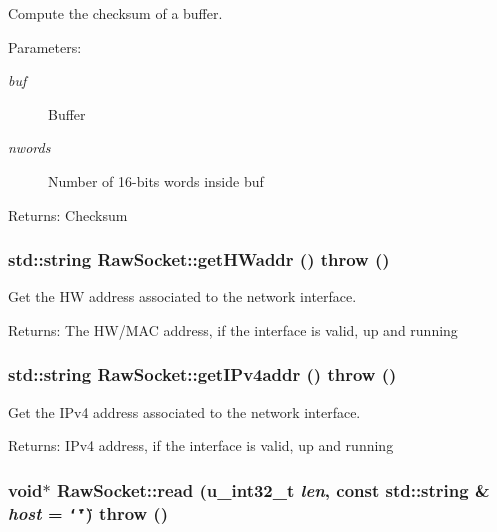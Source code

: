 Compute the checksum of a buffer. 

\begin{Desc}
\item[Parameters:]
\begin{description}
\item[{\em buf}]Buffer \item[{\em nwords}]Number of 16-bits words inside buf \end{description}
\end{Desc}
\begin{Desc}
\item[Returns:]Checksum \end{Desc}
\hypertarget{classRawSocket_b35260c4a551194b50925537785bcf47}{
\subsubsection[{getHWaddr}]{\setlength{\rightskip}{0pt plus 5cm}std::string RawSocket::getHWaddr ()  throw ()}}
\label{classRawSocket_b35260c4a551194b50925537785bcf47}


Get the HW address associated to the network interface. 

\begin{Desc}
\item[Returns:]The HW/MAC address, if the interface is valid, up and running \end{Desc}
\hypertarget{classRawSocket_dda64a716b48c1527283c026bda208d6}{
\subsubsection[{getIPv4addr}]{\setlength{\rightskip}{0pt plus 5cm}std::string RawSocket::getIPv4addr ()  throw ()}}
\label{classRawSocket_dda64a716b48c1527283c026bda208d6}


Get the IPv4 address associated to the network interface. 

\begin{Desc}
\item[Returns:]IPv4 address, if the interface is valid, up and running \end{Desc}
\hypertarget{classRawSocket_f41dd9eca89c3e4bb5c5bbf5af10dbd7}{
\subsubsection[{read}]{\setlength{\rightskip}{0pt plus 5cm}void$\ast$ RawSocket::read (u\_\-int32\_\-t {\em len}, \/  const std::string \& {\em host} = {\tt \char`\"{}\char`\"{}})  throw ()}}
\label{classRawSocket_f41dd9eca89c3e4bb5c5bbf5af10dbd7}


